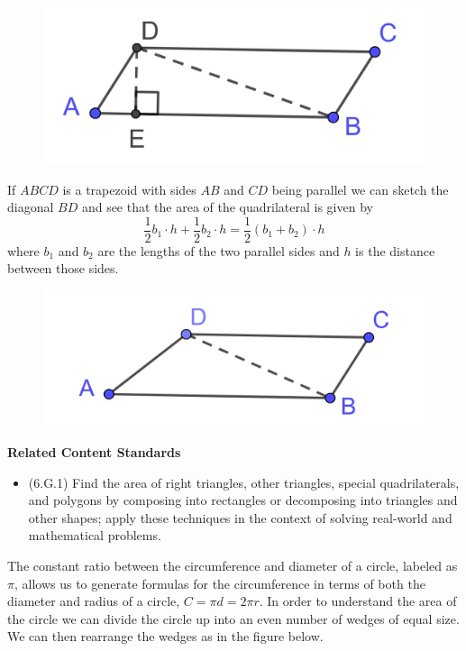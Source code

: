 \documentclass[
]{book}
\providecommand{\tightlist}{%
  \setlength{\itemsep}{0pt}\setlength{\parskip}{0pt}}
\newenvironment{standards}{}{}
\theoremstyle{definition}
\theoremstyle{definition}
\theoremstyle{definition}
\theoremstyle{definition}
\theoremstyle{remark}
\begin{document}
\begin{figure}

{\centering \includegraphics[width=0.3\linewidth]{images/area_parallelogram} 

}

\end{figure}

If \(ABCD\) is a trapezoid with sides \(AB\) and \(CD\) being parallel we can sketch the diagonal \(BD\) and see that the area of the quadrilateral is given by
\[ \frac{1}{2} b_1 \cdot h + \frac{1}{2} b_2 \cdot h = \frac{1}{2} (b_1+b_2)\cdot h\] where \(b_1\) and \(b_2\) are the lengths of the two parallel sides and \(h\) is the distance between those sides.

\begin{figure}

{\centering \includegraphics[width=0.3\linewidth]{images/area_trapezoid} 

}

\end{figure}

\begin{standards}

\begin{center}
\textbf{Related Content Standards}

\end{center}

\begin{itemize}
\tightlist
\item
  (6.G.1) Find the area of right triangles, other triangles, special quadrilaterals, and polygons by composing into rectangles or decomposing into triangles and other shapes; apply these techniques in the context of solving real-world and mathematical problems.
\end{itemize}

\end{standards}

The constant ratio between the circumference and diameter of a circle, labeled as \(\pi\), allows us to generate formulas for the circumference in terms of both the diameter and radius of a circle, \(C=\pi d = 2 \pi r\). In order to understand the area of the circle we can divide the circle up into an even number of wedges of equal size. We can then rearrange the wedges as in the figure below.
\end{document}
